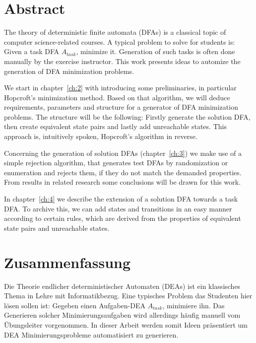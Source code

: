 
\chapter{Abstract}


The theory of deterministic finite automata (DFAs) is a classical topic of computer science-related courses. A typical problem to solve for students is: Given a task DFA $A_{task}$, minimize it. Generation of such tasks is often done manually by the exercise instructor. This work presents ideas to automize the generation of DFA minimization problems.


We start in chapter~\ref{ch:2} with introducing some preliminaries, in particular Hopcroft's minimization method. Based on that algorithm, we will deduce requirements, parameters and structure for a generator of DFA minimization problems. The structure will be the following: Firstly generate the solution DFA, then create equivalent state pairs and lastly add unreachable states. This approach is, intuitively spoken, Hopcroft's algorithm in reverse.


Concerning the generation of solution DFAs (chapter~\ref{ch:3}) we make use of a simple rejection algorithm, that generates test DFAs by randomization or enumeration and rejects them, if they do not match the demanded properties. From results in related research some conclusions will be drawn for this work.


In chapter~\ref{ch:4} we describe the extension of a solution DFA towards a task DFA. To archive this, we can add states and transitions in an easy manner according to certain rules, which are derived from the properties of equivalent state pairs and unreachable states. 



\chapter{Zusammenfassung}

Die Theorie endlicher deterministischer Automaten (DEAs) ist ein klassisches Thema in Lehre mit Informatikbezug. Eine typisches Problem das Studenten hier lösen sollen ist: Gegeben einen Aufgaben-DEA $A_{task}$, minimiere ihn. Das Generieren solcher Minimierungsaufgaben wird allerdings häufig manuell vom Übungsleiter vorgenommen. In dieser Arbeit werden somit Ideen präsentiert um DEA Minimierungsprobleme automatisiert zu generieren.

